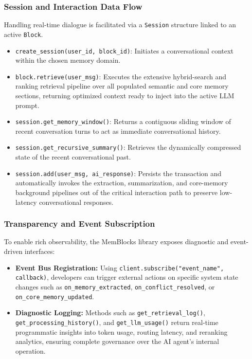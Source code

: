 \documentclass[12pt,a4paper]{article}
\begin{document}
\subsubsection{Session and Interaction Data Flow}
Handling real-time dialogue is facilitated via a \texttt{Session} structure linked to an active \texttt{Block}.
\begin{itemize}
    \item \texttt{create\_session(user\_id, block\_id)}: Initiates a conversational context within the chosen memory domain.
    \item \texttt{block.retrieve(user\_msg)}: Executes the extensive hybrid-search and ranking retrieval pipeline over all populated semantic and core memory sections, returning optimized context ready to inject into the active LLM prompt.
    \item \texttt{session.get\_memory\_window()}: Returns a contiguous sliding window of recent conversation turns to act as immediate conversational history.
    \item \texttt{session.get\_recursive\_summary()}: Retrieves the dynamically compressed state of the recent conversational past.
    \item \texttt{session.add(user\_msg, ai\_response)}: Persists the transaction and automatically invokes the extraction, summarization, and core-memory background pipelines out of the critical interaction path to preserve low-latency conversational responses.
\end{itemize}

\subsubsection{Transparency and Event Subscription}
To enable rich observability, the MemBlocks library exposes diagnostic and event-driven interfaces:
\begin{itemize}
    \item \textbf{Event Bus Registration:} Using \texttt{client.subscribe("event\_name", callback)}, developers can trigger external actions on specific system state changes such as \texttt{on\_memory\_extracted}, \texttt{on\_conflict\_resolved}, or \texttt{on\_core\_memory\_updated}.
    \item \textbf{Diagnostic Logging:} Methods such as \texttt{get\_retrieval\_log()}, \texttt{get\_processing\_history()}, and \texttt{get\_llm\_usage()} return real-time programmatic insights into token usage, routing latency, and reranking analytics, ensuring complete governance over the AI agent's internal operation.
\end{itemize}
\end{document}
